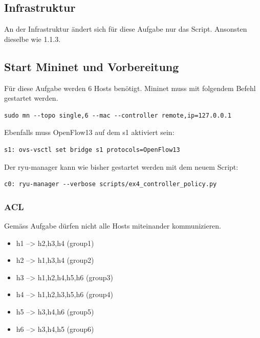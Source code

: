 \documentclass[a4,12pt]{scrartcl}
\begin{document}
\subsection{Infrastruktur}
An der Infrastruktur ändert sich für diese Aufgabe nur das Script. Ansonsten dieselbe wie 1.1.3.

\subsection{Start Mininet und Vorbereitung}
Für diese Aufgabe werden 6 Hosts benötigt. Mininet muss mit folgendem Befehl gestartet werden.
\begin{lstlisting}
sudo mn --topo single,6 --mac --controller remote,ip=127.0.0.1 
\end{lstlisting}
Ebenfalls muss OpenFlow13 auf dem s1 aktiviert sein: 
\begin{lstlisting}
s1: ovs-vsctl set bridge s1 protocols=OpenFlow13
\end{lstlisting}
Der ryu-manager kann wie bisher gestartet werden mit dem neuem Script: 
\begin{lstlisting}
c0: ryu-manager --verbose scripts/ex4_controller_policy.py
\end{lstlisting}

\subsubsection{ACL}
Gemäss Aufgabe dürfen nicht alle Hosts miteinander kommunizieren. 
\begin{itemize}
\item h1 --> h2,h3,h4 (group1)
\item h2 --> h1,h3,h4 (group2)
\item h3 --> h1,h2,h4,h5,h6 (group3)
\item h4 --> h1,h2,h3,h5,h6 (group4)
\item h5 --> h3,h4,h6 (group5)
\item h6 --> h3,h4,h5 (group6)
\end{itemize}
\end{document}
